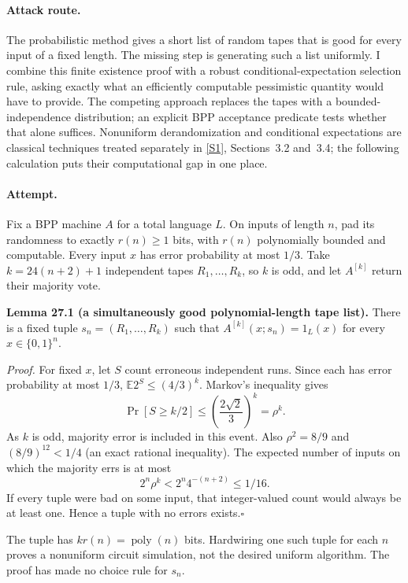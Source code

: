 \documentclass[11pt,a4paper]{article}
\newcommand{\sref}[2]{\hyperlink{source:#1:#2}{[S#2]}}
\numberwithin{equation}{section}
\begin{document}
\paragraph{Attack route.}
The probabilistic method gives a short list of random tapes that is good
for every input of a fixed length. The missing step is generating such a
list uniformly. I combine this finite existence proof with a robust
conditional-expectation selection rule, asking exactly what an efficiently
computable pessimistic quantity would have to provide. The competing
approach replaces the tapes with a bounded-independence distribution;
an explicit BPP acceptance predicate tests whether that alone suffices.
Nonuniform derandomization and conditional expectations are classical
techniques treated separately in \sref{27}{1}, Sections~3.2 and~3.4;
the following calculation puts their computational gap in one place.

\paragraph{Attempt.}
Fix a BPP machine $A$ for a total language $L$. On inputs of length $n$,
pad its randomness to exactly $r(n)\ge1$ bits, with $r(n)$ polynomially
bounded and computable. Every input $x$ has error probability at most
$1/3$. Take $k=24(n+2)+1$ independent tapes $R_1,\ldots,R_k$, so $k$ is
odd, and let $A^{[k]}$ return their majority vote.

\textbf{Lemma 27.1 (a simultaneously good polynomial-length tape list).}
There is a fixed tuple $s_n=(R_1,\ldots,R_k)$ such that
$A^{[k]}(x;s_n)=1_L(x)$ for every $x\in\{0,1\}^n$.

\emph{Proof.} For fixed $x$, let $S$ count erroneous independent runs.
Since each has error probability at most $1/3$,
$\mathbb E2^S\le(4/3)^k$. Markov's inequality gives
\[
 \Pr[S\ge k/2]\le\left(\frac{2\sqrt2}{3}\right)^k=\rho^k.
\]
As $k$ is odd, majority error is included in this event. Also
$\rho^2=8/9$ and $(8/9)^{12}<1/4$ (an exact rational inequality).
The expected number of inputs on which the majority errs is at most
\begin{equation}\label{r27:smallpotential}
       2^n\rho^k<2^n4^{-(n+2)}\le1/16.
\end{equation}
If every tuple were bad on some input, that integer-valued count would
always be at least one. Hence a tuple with no errors exists.\hfill$\square$

The tuple has $kr(n)=\operatorname{poly}(n)$ bits. Hardwiring one such
tuple for each $n$ proves a nonuniform circuit simulation, not the desired
uniform algorithm. The proof has made no choice rule for $s_n$.
\end{document}
